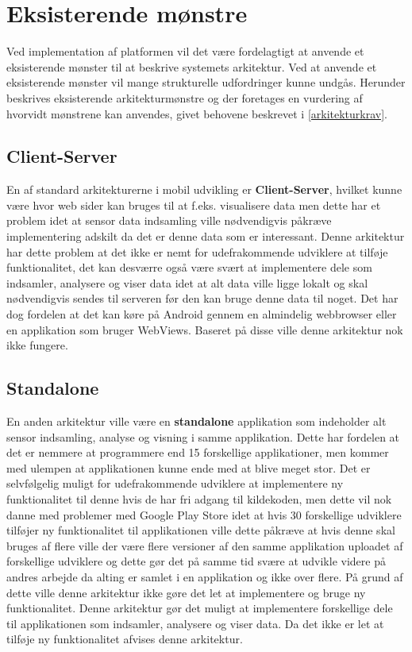 \section{Eksisterende mønstre}
Ved implementation af platformen vil det være fordelagtigt at anvende et eksisterende mønster til at beskrive systemets arkitektur.
Ved at anvende et eksisterende mønster vil mange strukturelle udfordringer kunne undgås.
Herunder beskrives eksisterende arkitekturmønstre og der foretages en vurdering af hvorvidt mønstrene kan anvendes, givet behovene beskrevet i \cref{arkitekturkrav}.

\subsection{Client-Server}
En af standard arkitekturerne i mobil udvikling er \textbf{Client-Server}, hvilket kunne være hvor web sider kan bruges til at f.eks. visualisere data men dette har et problem idet at sensor data indsamling ville nødvendigvis påkræve implementering adskilt da det er denne data som er interessant.
Denne arkitektur har dette problem at det ikke er nemt for udefrakommende udviklere at tilføje funktionalitet, det kan desværre også være svært at implementere dele som indsamler, analysere og viser data idet at alt data ville ligge lokalt og skal nødvendigvis sendes til serveren før den kan bruge denne data til noget. 
Det har dog fordelen at det kan køre på Android gennem en almindelig webbrowser eller en applikation som bruger WebViews.
Baseret på disse ville denne arkitektur nok ikke fungere.
\subsection{Standalone}
En anden arkitektur ville være en \textbf{standalone} applikation som indeholder alt sensor indsamling, analyse og visning i samme applikation.
Dette har fordelen at det er nemmere at programmere end 15 forskellige applikationer, men kommer med ulempen at applikationen kunne ende med at blive meget stor.
Det er selvfølgelig muligt for udefrakommende udviklere at implementere ny funktionalitet til denne hvis de har fri adgang til kildekoden, men dette vil nok danne med problemer med Google Play Store idet at hvis 30 forskellige udviklere tilføjer ny funktionalitet til applikationen ville dette påkræve at hvis denne skal bruges af flere ville der være flere versioner af den samme applikation uploadet af forskellige udviklere og dette gør det på samme tid svære at udvikle videre på andres arbejde da alting er samlet i en applikation og ikke over flere.
På grund af dette ville denne arkitektur ikke gøre det let at implementere og bruge ny funktionalitet.
Denne arkitektur gør det muligt at implementere forskellige dele til applikationen som indsamler, analysere og viser data.
Da det ikke er let at tilføje ny funktionalitet afvises denne arkitektur. 

